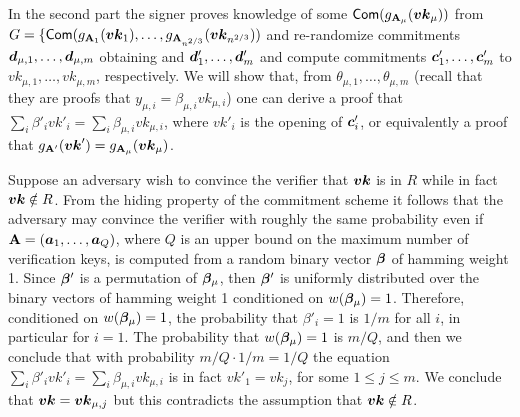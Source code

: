 In the second part the signer proves knowledge of some $\mathsf{Com}(g_{\mathbf{{A}}_\mu}({\boldsymbol{vk}}_\mu))$ from $G = \{\mathsf{Com}(g_{\mathbf{{A}}_1}({\boldsymbol{vk}}_1),\allowbreak\ldots,g_{\mathbf{{A}}_{n^{2/3}}}({\boldsymbol{vk}}_{n^{2/3}}))$ and re-randomize commitments ${\boldsymbol{d}}_{\mu,1},\allowbreak\ldots,\allowbreak{\boldsymbol{d}}_{\mu,m}$ obtaining and ${\boldsymbol{d}}'_1,\ldots,{\boldsymbol{d}}'_m$ and compute commitments ${\boldsymbol{c}}'_1,\allowbreak\ldots,{\boldsymbol{c}}'_m$ to $vk_{\mu,1},\ldots,vk_{\mu,m}$, respectively. We will show that, from $\theta_{\mu,1},\ldots,\theta_{\mu,m}$ (recall that they are proofs that $y_{\mu,i} = \beta_{\mu,i}vk_{\mu,i}$) one can derive a proof that $\sum_i \beta'_i vk'_i  = \sum_{i} \beta_{\mu,i}vk_{\mu,i}$, where $vk'_i$ is the opening of ${\boldsymbol{c}}'_i$, or equivalently a proof that $g_{\mathbf{{A}}'}({\boldsymbol{vk}}') = g_{\mathbf{{A}}_\mu}({\boldsymbol{vk}}_\mu)$.


Suppose an adversary wish to convince the verifier that ${\boldsymbol{vk}}$ is in $R$ while in fact ${\boldsymbol{vk}}\notin R$.
From the hiding property of the commitment scheme
it follows that the adversary may convince the verifier
with roughly the same probability even if $\mathbf{{A}} = ({\boldsymbol{a}}_1,\ldots,{\boldsymbol{a}}_Q)$, where $Q$ is an upper bound on the maximum number of verification keys, is computed from a random binary vector ${\boldsymbol{\beta}}$ of hamming weight 1. Since ${\boldsymbol{\beta}}'$ is a permutation of ${\boldsymbol{\beta}}_\mu$, then ${\boldsymbol{\beta}}'$ is uniformly distributed over the binary vectors of hamming weight 1 conditioned on $w({\boldsymbol{\beta}}_\mu)=1$. Therefore, conditioned on $w({\boldsymbol{\beta}}_\mu)=1$, the probability that $\beta'_i=1$ is $1/m$ for all $i$, in particular for $i=1$. The probability that $w({\boldsymbol{\beta}}_\mu)=1$ is $m/Q$, and then we conclude that with probability $m/Q\cdot 1/m = 1/Q$ the equation $\sum_{i}\beta'_i vk'_i = \sum_{i}\beta_{\mu,i} vk_{\mu,i}$ is in fact $vk'_1 = vk_j$, for some $1\leq j \leq m$. We conclude that ${\boldsymbol{vk}}={\boldsymbol{vk}}_{\mu,j}$ but this contradicts the assumption that ${\boldsymbol{vk}}\notin R$. 

